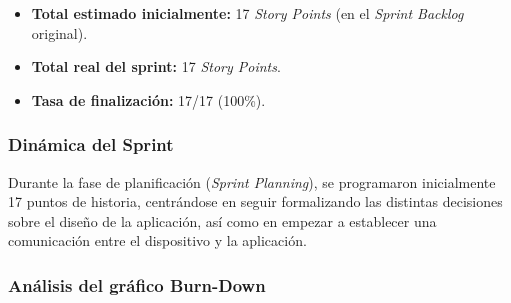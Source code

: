\begin{table}[H]
    \centering
    \caption{Catálogo de tareas del Sprint 2.}
\end{table}

\begin{itemize}
    \item \textbf{Total estimado inicialmente:} 17 \textit{Story Points} (en el \textit{Sprint Backlog} original).
    \item \textbf{Total real del sprint:} 17 \textit{Story Points}.
    \item \textbf{Tasa de finalización:} 17/17 (100\%).
\end{itemize}

\subsubsection{Dinámica del Sprint}
Durante la fase de planificación (\textit{Sprint Planning}), se programaron inicialmente 17 puntos de historia, centrándose en seguir formalizando las distintas decisiones sobre el diseño de la aplicación, así como en empezar a establecer una comunicación entre el dispositivo y la aplicación.

\subsubsection{Análisis del gráfico Burn-Down}

